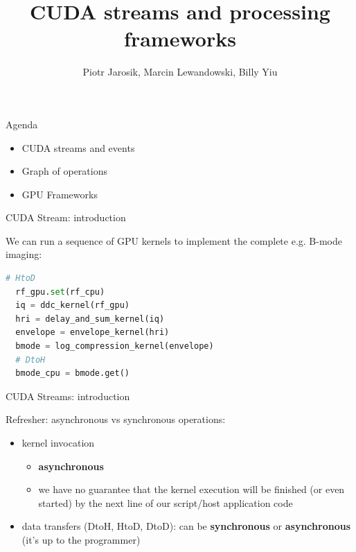 \documentclass[xcolor=table]{beamer}
\title[CUDA streams and processing frameworks]{CUDA streams and processing frameworks}
\author[P. Jarosik et al]{Piotr Jarosik, Marcin Lewandowski, Billy Yiu}
\institute[IPPT PAN] 
{
\vspace{5mm}
GPU Short Course, IEEE UFFC-JS 2024
\medskip
}
\date{}
\begin{document}
\begin{frame}
\titlepage
\end{frame}

\newcommand{\outline}{
\begin{frame}[allowframebreaks]{Agenda}
\frametitle{Agenda}
\tableofcontents 
\end{frame}
}
\newcommand{\references} {
\begin{frame}[allowframebreaks]{References}
\frametitle{References}
    \printbibliography
\end{frame}
}


\begin{frame}{Agenda}

  \begin{itemize}
    \item CUDA streams and events
    \item Graph of operations
    \item GPU Frameworks
  \end{itemize}

\end{frame}


\begin{frame}[fragile]{CUDA Stream: introduction}

  We can run a sequence of GPU kernels to implement the complete e.g. B-mode imaging:

\begin{lstlisting}[language=Python]
  # HtoD
  rf_gpu.set(rf_cpu)
  iq = ddc_kernel(rf_gpu)
  hri = delay_and_sum_kernel(iq)
  envelope = envelope_kernel(hri)
  bmode = log_compression_kernel(envelope)
  # DtoH
  bmode_cpu = bmode.get()
\end{lstlisting}

\end{frame}


\begin{frame}{CUDA Streams: introduction}

  Refresher: asynchronous vs synchronous operations:
  \begin{itemize}
  \item kernel invocation
    \begin{itemize}
      \item \textbf{asynchronous} 
      \item we have no guarantee that the kernel execution will be finished (or even started) by the next line of our script/host application code
    \end{itemize}
  \item data transfers (DtoH, HtoD, DtoD): can be \textbf{synchronous} or \textbf{asynchronous} (it's up to the programmer)
  \end{itemize}
\end{frame}
\end{document}
